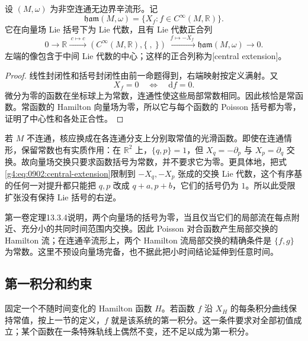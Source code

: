 \begin{proposition}\label{g4:prop:0902:central-extension}
	设 \((M,\omega)\) 为非空连通无边界辛流形。记
	\[
		\mathfrak{ham}(M,\omega)
		=\{X_f:f\in C^\infty(M,\mathbb R)\}.
	\]
	它在向量场 Lie 括号下为 Lie 代数，且有 Lie 代数正合列
	\begin{equation}\label{g4:eq:0902:central-extension}
		0\longrightarrow\mathbb R
		\xrightarrow{\;c\mapsto c\;}
		(C^\infty(M,\mathbb R),\{\ ,\ \})
		\xrightarrow{\;f\mapsto-X_f\;}
		\mathfrak{ham}(M,\omega)
		\longrightarrow0.
	\end{equation}
	左端的像包含于中间 Lie 代数的中心；这样的正合列称为[central extension]。
\end{proposition}
\begin{proof}
	线性封闭性和括号封闭性由前一命题得到，右端映射按定义满射。又
	\[
		X_f=0\quad\Longleftrightarrow\quad \mathrm{d}f=0.
	\]
	微分为零的函数在坐标球上为常数，连通性使这些局部常数相同。因此核恰是常函数。常函数的 Hamilton 向量场为零，所以它与每个函数的 Poisson 括号都为零，证明了中心性和各处正合性。
\end{proof}

若 \(M\) 不连通，核应换成在各连通分支上分别取常值的光滑函数。即使在连通情形，保留常数也有实质作用：在 \(\mathbb R^2\) 上，\(\{q,p\}=1\)，但 \(X_q=-\partial_p\) 与 \(X_p=\partial_q\) 交换。故向量场交换只要求函数括号为常数，并不要求它为零。更具体地，把式\eqref{g4:eq:0902:central-extension}限制到 \(-X_q,-X_p\) 张成的交换 Lie 代数，这个有序基的任何一对提升都只能把 \(q,p\) 改成 \(q+a,p+b\)，它们的括号仍为 \(1\)。所以此受限扩张没有保持 Lie 括号的右逆。

\ProseParagraphBreak

第一卷定理13.3.4说明，两个向量场的括号为零，当且仅当它们的局部流在每点附近、充分小的共同时间范围内交换。因此 Poisson 对合函数产生局部交换的 Hamilton 流；在连通辛流形上，两个 Hamilton 流局部交换的精确条件是 \(\{f,g\}\) 为常数。这里不预设向量场完备，也不据此把小时间结论延伸到任意时间。

\subsection{第一积分和约束}
\label{g4:subsec:0902:03}

固定一个不随时间变化的 Hamilton 函数 \(H\)。若函数 \(f\) 沿 \(X_H\) 的每条积分曲线保持常值，按上一节的定义，\(f\) 就是该系统的第一积分。这一条件要求对全部初值成立；某个函数在一条特殊轨线上偶然不变，还不足以成为第一积分。

